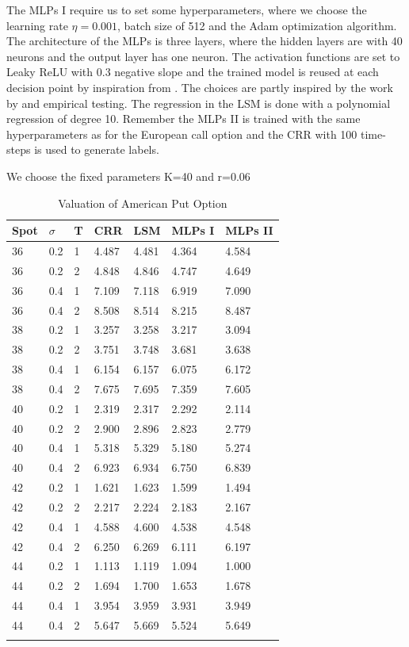 The MLPs I require us to set some hyperparameters, where we choose the learning rate $\eta=0.001$, batch size of 512 and the Adam optimization algorithm. The architecture of the MLPs is three layers, where the hidden layers are with 40 neurons and the output layer has one neuron. The activation functions are set to Leaky ReLU with 0.3 negative slope and the trained model is reused at each decision point by inspiration from \parencite{Lelong19}. The choices are partly inspired by the work by \parencite{Lelong19} and empirical testing. The regression in the LSM is done with a polynomial regression of degree 10. Remember the MLPs II is trained with the same hyperparameters as for the European call option and the CRR with 100 time-steps is used to generate labels.\\

\begin{table}[th]
\caption{Valuation of American Put Option}{We choose the fixed parameters K=40 and r=0.06}
\label{tab:AmericanPut}
\centering
\begin{tabular}{l l l l l l l }
\toprule
\textbf{Spot} & \textbf{$\sigma$} & \textbf{T} & \textbf{CRR} & \textbf{LSM} & \textbf{MLPs I} & \textbf{MLPs II} \\
\midrule
36 & 0.2 & 1 & 4.487 & 4.481 & 4.364 & 4.584\\
36 & 0.2 & 2 & 4.848 & 4.846 & 4.747 & 4.649\\
36 & 0.4 & 1 & 7.109 & 7.118 & 6.919 & 7.090\\
36 & 0.4 & 2 & 8.508 & 8.514 & 8.215 & 8.487\\
38 & 0.2 & 1 & 3.257 & 3.258 & 3.217 & 3.094\\
38 & 0.2 & 2 & 3.751 & 3.748 & 3.681 & 3.638\\
38 & 0.4 & 1 & 6.154 & 6.157 & 6.075 & 6.172\\
38 & 0.4 & 2 & 7.675 & 7.695 & 7.359 & 7.605\\
40 & 0.2 & 1 & 2.319 & 2.317 & 2.292 & 2.114\\
40 & 0.2 & 2 & 2.900 & 2.896 & 2.823 & 2.779\\
40 & 0.4 & 1 & 5.318 & 5.329 & 5.180 & 5.274\\
40 & 0.4 & 2 & 6.923 & 6.934 & 6.750 & 6.839\\
42 & 0.2 & 1 & 1.621 & 1.623 & 1.599 & 1.494\\
42 & 0.2 & 2 & 2.217 & 2.224 & 2.183 & 2.167\\
42 & 0.4 & 1 & 4.588 & 4.600 & 4.538 & 4.548\\
42 & 0.4 & 2 & 6.250 & 6.269 & 6.111 & 6.197\\
44 & 0.2 & 1 & 1.113 & 1.119 & 1.094 & 1.000\\
44 & 0.2 & 2 & 1.694 & 1.700 & 1.653 & 1.678\\
44 & 0.4 & 1 & 3.954 & 3.959 & 3.931 & 3.949\\
44 & 0.4 & 2 & 5.647 & 5.669 & 5.524 & 5.649\\
\bottomrule\\
\end{tabular}
\end{table}

